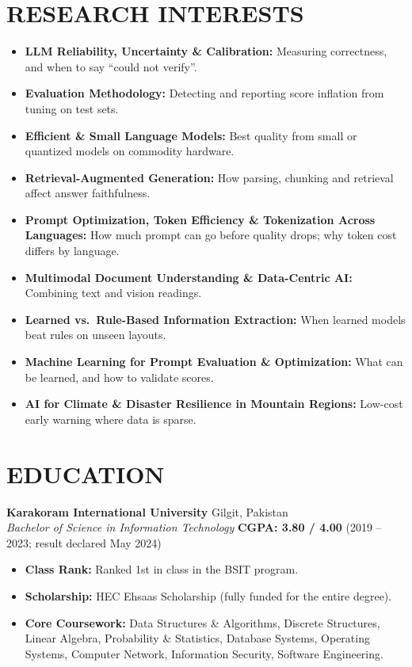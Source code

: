 \documentclass[a4paper,10pt]{article}
\begin{document}
\section{RESEARCH INTERESTS}
\begin{itemize}
    \item \textbf{LLM Reliability, Uncertainty \& Calibration:} Measuring correctness, and when to say ``could not verify''.
    \item \textbf{Evaluation Methodology:} Detecting and reporting score inflation from tuning on test sets.
    \item \textbf{Efficient \& Small Language Models:} Best quality from small or quantized models on commodity hardware.
    \item \textbf{Retrieval-Augmented Generation:} How parsing, chunking and retrieval affect answer faithfulness.
    \item \textbf{Prompt Optimization, Token Efficiency \& Tokenization Across Languages:} How much prompt can go before quality drops; why token cost differs by language.
    \item \textbf{Multimodal Document Understanding \& Data-Centric AI:} Combining text and vision readings.
    \item \textbf{Learned vs.\ Rule-Based Information Extraction:} When learned models beat rules on unseen layouts.
    \item \textbf{Machine Learning for Prompt Evaluation \& Optimization:} What can be learned, and how to validate scores.
    \item \textbf{AI for Climate \& Disaster Resilience in Mountain Regions:} Low-cost early warning where data is sparse.
\end{itemize}

\section{EDUCATION}
\textbf{Karakoram International University} \hfill Gilgit, Pakistan \\
\textit{Bachelor of Science in Information Technology} \hfill \textbf{CGPA: 3.80 / 4.00} (2019 -- 2023; result declared May 2024)
\begin{itemize}
    \item \textbf{Class Rank:} Ranked 1st in class in the BSIT program.
    \item \textbf{Scholarship:} HEC Ehsaas Scholarship (fully funded for the entire degree).
    \item \textbf{Core Coursework:} Data Structures \& Algorithms, Discrete Structures, Linear Algebra, Probability \& Statistics, Database Systems, Operating Systems, Computer Network, Information Security, Software Engineering.
\end{itemize}
\end{document}
